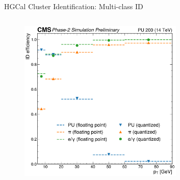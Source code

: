 \documentclass[aspectratio=169]{beamer}\usepackage[utf8]{inputenc}
\begin{document}
\begin{frame}{HGCal Cluster Identification: Multi-class ID}
\begin{columns}[c]
\begin{column}{.4\textwidth}
\begin{figure}
\centering
    \includegraphics[width=0.7\textwidth]{endcap_figs/HGC_eff_xgb_conifer.pdf}
\end{figure}


\end{column}


\end{columns}

\end{frame}
\end{document}
